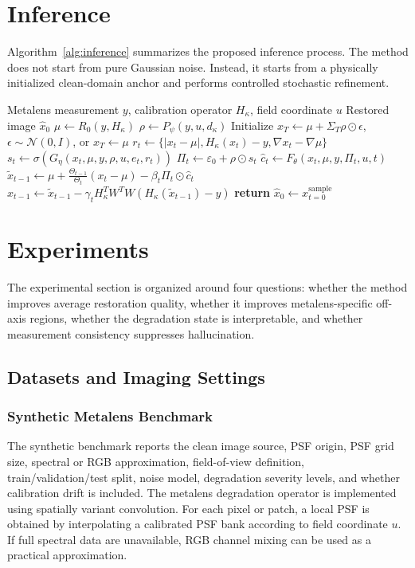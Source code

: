 \documentclass[journal]{IEEEtran}
\newcommand{\N}{\mathcal{N}}
\newcommand{\hk}{H_{\kappa}}
\newcommand{\eps}{\varepsilon}
\begin{document}
\section{Inference}
Algorithm~\ref{alg:inference} summarizes the proposed inference process. The method does not start from pure Gaussian noise. Instead, it starts from a physically initialized clean-domain anchor and performs controlled stochastic refinement.

\begin{algorithm}[t]
\caption{Physics-Anchored Degradation-State Diffusion Bridge Inference}
\label{alg:inference}
\begin{algorithmic}[1]
\REQUIRE Metalens measurement $y$, calibration operator $\hk$, field coordinate $u$
\ENSURE Restored image $\hat{x}_0$
\STATE $\mu \leftarrow R_0(y,\hk)$
\STATE $\rho \leftarrow P_{\psi}(y,u,d_{\kappa})$
\STATE Initialize $x_T \leftarrow \mu+\Sigma_T\rho\odot\epsilon$, $\epsilon\sim\N(0,I)$, or $x_T\leftarrow\mu$
    \STATE $r_t \leftarrow \{ |x_t-\mu|,\hk(x_t)-y,\nabla x_t-\nabla\mu \}$
    \STATE $s_t \leftarrow \sigma(G_{\eta}(x_t,\mu,y,\rho,u,e_t,r_t))$
    \STATE $\Pi_t \leftarrow \eps_0+\rho\odot s_t$
    \STATE $\hat{c}_t \leftarrow F_{\theta}(x_t,\mu,y,\Pi_t,u,t)$
    \STATE $\tilde{x}_{t-1}\leftarrow\mu+\frac{\Theta_{t-1}}{\Theta_t}(x_t-\mu)-\beta_t\Pi_t\odot\hat c_t$
    \STATE $x_{t-1}\leftarrow\tilde{x}_{t-1}-\gamma_t\hk^T W^T W(\hk(\tilde{x}_{t-1})-y)$
\ENDFOR
\STATE \textbf{return} $\hat{x}_0\leftarrow x_{t=0}^{\mathrm{sample}}$
\end{algorithmic}
\end{algorithm}

\section{Experiments}
The experimental section is organized around four questions: whether the method improves average restoration quality, whether it improves metalens-specific off-axis regions, whether the degradation state is interpretable, and whether measurement consistency suppresses hallucination.

\subsection{Datasets and Imaging Settings}
\subsubsection{Synthetic Metalens Benchmark}
The synthetic benchmark reports the clean image source, PSF origin, PSF grid size, spectral or RGB approximation, field-of-view definition, train/validation/test split, noise model, degradation severity levels, and whether calibration drift is included. The metalens degradation operator is implemented using spatially variant convolution. For each pixel or patch, a local PSF is obtained by interpolating a calibrated PSF bank according to field coordinate $u$. If full spectral data are unavailable, RGB channel mixing can be used as a practical approximation.
\end{document}
